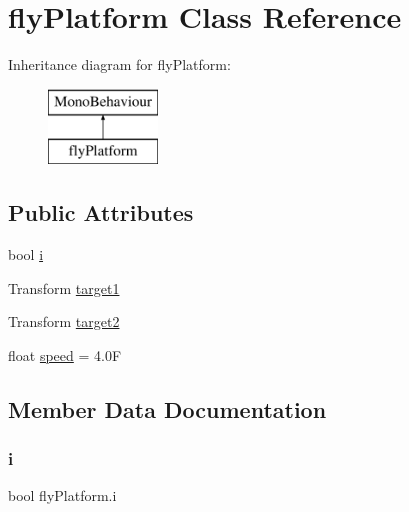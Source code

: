 \hypertarget{classfly_platform}{}\section{fly\+Platform Class Reference}
\label{classfly_platform}
Inheritance diagram for fly\+Platform\+:\begin{figure}[H]
\begin{center}
\leavevmode
\includegraphics[height=2.000000cm]{classfly_platform}
\end{center}
\end{figure}
\subsection*{Public Attributes}
\begin{DoxyCompactItemize}
\item 
bool \mbox{\hyperlink{classfly_platform_acbbfd6480b1b6f5c169136478b63f217}{i}}
\item 
Transform \mbox{\hyperlink{classfly_platform_ada60b6e640fea01d20ead9c900dd42db}{target1}}
\item 
Transform \mbox{\hyperlink{classfly_platform_a6d9c0311b4c421ba400f7fbf34deeec2}{target2}}
\item 
float \mbox{\hyperlink{classfly_platform_aa1ce895856228c9e3c84f1f0410022de}{speed}} = 4.\+0F
\end{DoxyCompactItemize}


\subsection{Member Data Documentation}
\mbox{\label{classfly_platform_acbbfd6480b1b6f5c169136478b63f217}} 
\subsubsection{\texorpdfstring{i}{i}}
{\footnotesize\ttfamily bool fly\+Platform.\+i}

\mbox{\label{classfly_platform_aa1ce895856228c9e3c84f1f0410022de}} 
